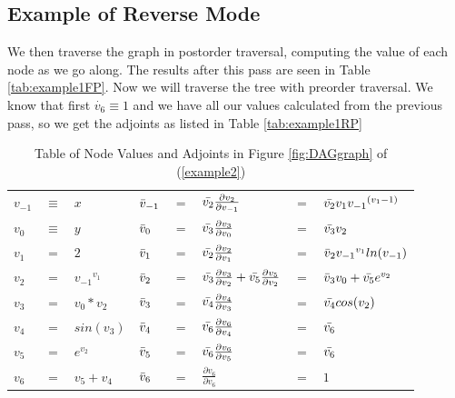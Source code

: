 \documentclass{article}
\begin{document}
\subsection{Example of Reverse Mode}


We then traverse the graph in postorder traversal, computing the value of each node as we go along. The results after this pass are seen in Table \ref{tab:example1FP}. Now we will traverse the tree with preorder traversal. We know that first $\dot{v_6} \equiv 1$ and we have all our values calculated from the previous pass, so we get the adjoints as listed in Table \ref{tab:example1RP}


\begin{table}[h!]
    \centering
    \begin{tabular}{|lcl|lclll|}
        \hline
        $v_{-1}$ & $\equiv$ & $x$ & $\Bar{v}_{-1}$ & $=$ & $\Bar{v_2}\frac{\partial{v_2}}{\partial{v_{-1}}}$ & $=$ & $\Bar{v_2}v_1 {v_{-1}}^{(v_{1}-1)}$\\
        $v_{0}$ & $\equiv$ & $y$ & $\Bar{v}_{0}$ & $=$ & $\Bar{v_3}\frac{\partial{v_3}}{\partial{v_0}}$ & $=$ & $\Bar{v_3}v_2$\\
        \hline
        $v_{1}$ & $=$ & $2$ & $\Bar{v}_{1}$ & $=$ & $\Bar{v_2}\frac{\partial{v_2}}{\partial{v_1}}$ & $=$ & $\Bar{v}_{2}{v_{-1}}^{v_{1}}ln(v_{-1})$\\
        $v_{2}$ & $=$ & ${v_{-1}}^{v_{1}}$ & $\Bar{v}_{2}$ & $=$ & $\Bar{v_3}\frac{\partial{v_3}}{\partial{v_2}} + \Bar{v_5}\frac{\partial{v_5}}{\partial{v_2}}$ & $=$ & $\Bar{v}_{3}v_0 + \Bar{v_5}e^{v_2}$\\
        $v_{3}$ & $=$ & ${v_{0}}*{v_{2}}$ & $\Bar{v}_{3}$ & $=$ & $\Bar{v_4}\frac{\partial{v_4}}{\partial{v_3}}$ & $=$ & $\Bar{v_4}cos(v_2)$\\
        $v_{4}$ & $=$ & $sin(v_3)$ & $\Bar{v}_{4}$ & $=$ & $\Bar{v_6}\frac{\partial{v_6}}{\partial{v_4}}$ & $=$ & $\Bar{v_6}$\\
        $v_{5}$ & $=$ & $e^{v_2}$ & $\Bar{v}_{5}$ & $=$ & $\Bar{v_6}\frac{\partial{v_6}}{\partial{v_5}}$ & $=$ & $\Bar{v_6}$\\
        \hline
        $v_{6}$ & $=$ & $v_5 + v_4$ & $\Bar{v}_{6}$ & $=$ & $\frac{\partial{v_6}}{\partial{v_6}}$ & $=$ & $1$\\
        \hline
    \end{tabular}
    \caption{Table of Node Values and Adjoints in Figure \ref{fig:DAGgraph} of (\ref{example2})}
    \label{tab:example1}
\end{table}
\end{document}

